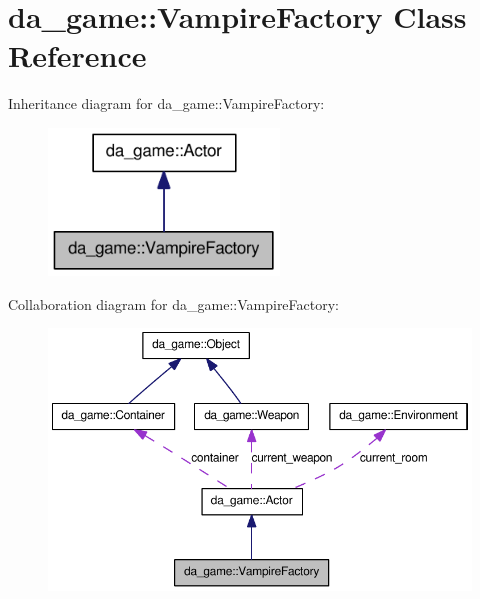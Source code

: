\hypertarget{classda__game_1_1VampireFactory}{
\section{da\_\-game::VampireFactory Class Reference}
\label{classda__game_1_1VampireFactory}
}
Inheritance diagram for da\_\-game::VampireFactory:\nopagebreak
\begin{figure}[H]
\begin{center}
\leavevmode
\includegraphics[width=174pt]{classda__game_1_1VampireFactory__inherit__graph}
\end{center}
\end{figure}
Collaboration diagram for da\_\-game::VampireFactory:\nopagebreak
\begin{figure}[H]
\begin{center}
\leavevmode
\includegraphics[width=394pt]{classda__game_1_1VampireFactory__coll__graph}
\end{center}
\end{figure}
